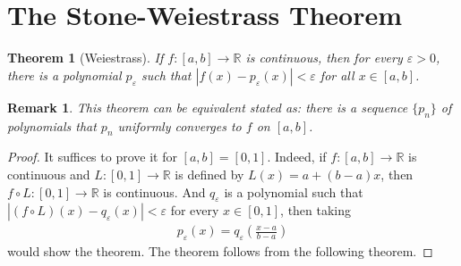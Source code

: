 \documentclass[10pt]{book}
\newtheorem{theorem}{Theorem}[chapter]
\newtheorem{remark}{Remark}[chapter]
\theoremstyle{definition}
\numberwithin{equation}{chapter}
\begin{document}
\medskip






\section{The Stone-Weiestrass Theorem}


\begin{theorem}[Weiestrass]\label{th_619}
If $f: [a,b] \to \mathbb{R}$ is continuous, then for every $\varepsilon > 0$, there is a polynomial $p_{\varepsilon}$ such that $\left|f(x) - p_{\varepsilon}(x)\right| < \varepsilon$ for all $x \in [a,b]$.
\end{theorem}

\begin{remark}
This theorem can be equivalent stated as: there is a sequence $\{p_n\}$ of polynomials that $p_n$ uniformly converges to $f$ on $[a,b]$.
\end{remark}

\begin{proof}
It suffices to prove it for $[a,b] = [0,1]$. Indeed, if $f: [a,b] \to \mathbb{R}$ is continuous and $L:[0,1] \to \mathbb{R}$ is defined by $L(x) = a + (b-a)x$, then $f \circ L:[0,1] \to \mathbb{R}$ is continuous. And $q_{\varepsilon}$ is a polynomial such that $\left|(f \circ L)(x) - q_{\varepsilon}(x)\right| < \varepsilon$ for every $x \in [0,1]$, then taking 
\begin{align*}
    p_{\varepsilon}(x) = q_{\varepsilon} \left(\frac{x - a}{b - a}\right)
\end{align*}
would show the theorem. The theorem follows from the following theorem.
\end{proof}

\medskip
\end{document}
